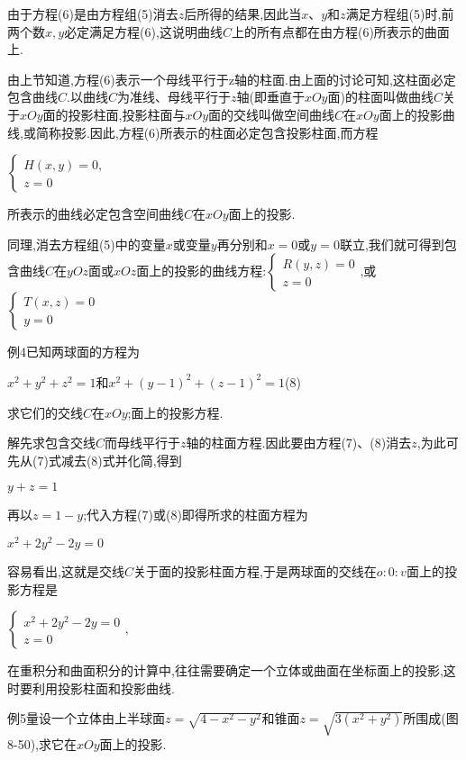 \documentclass[oneside]{book}
\begin{document}
由于方程(6)是由方程组(5)消去$z$后所得的结果,因此当$x$、$y$和$z$满足方程组(5)时,前两个数$x,y$必定满足方程(6),这说明曲线$C$上的所有点都在由方程(6)所表示的曲面上.

由上节知道,方程(6)表示一个母线平行于z轴的柱面.由上面的讨论可知,这柱面必定包含曲线$C$.以曲线$C$为准线、母线平行于$z$轴(即垂直于$xOy$面)的柱面叫做曲线$C$关于$xOy$面的投影柱面,投影柱面与$xOy$面的交线叫做空间曲线$C$在$xOy$面上的投影曲线,或简称投影.因此,方程(6)所表示的柱面必定包含投影柱面,而方程

$\left\{\begin{array}{l}{H(x, y)=0}, \\ {z=0}\end{array}\right.$

所表示的曲线必定包含空间曲线$C$在$xOy$面上的投影.

同理,消去方程组(5)中的变量$x$或变量$y$再分别和$x=0$或$y=0$联立,我们就可得到包含曲线$C$在$yOz$面或$xOz$面上的投影的曲线方程:$\left\{\begin{array}{l}{R(y, z)=0} \\ {z=0}\end{array}\right.$,或$\left\{\begin{array}{l}{T(x, z)=0} \\ {y=0}\end{array}\right.$

例4已知两球面的方程为

${x^2} + {y^2} + {z^2} = 1$和${x^2} + {\left( {y - 1} \right)^2} + {(z - 1)^2} = 1$(8)

求它们的交线$C$在$xOy$;面上的投影方程.

解先求包含交线$C$而母线平行于$z$轴的柱面方程.因此要由方程(7)、(8)消去$z$,为此可先从(7)式减去(8)式并化简,得到

$y + z = 1$

再以$z = 1 - y$;代入方程(7)或(8)即得所求的柱面方程为

${x^2} + 2{y^2} - 2y = 0$

容易看出,这就是交线$C$关于面的投影柱面方程,于是两球面的交线在$o:0:v$面上的投影方程是

$\left\{\begin{array}{l}{x^{2}+2 y^{2}-2 y=0} \\ {z=0}\end{array}\right.$,

在重积分和曲面积分的计算中,往往需要确定一个立体或曲面在坐标面上的投影,这时要利用投影柱面和投影曲线.

例5量设一个立体由上半球面$z = \sqrt {4 - {x^2} - {y^2}} $和锥面$z = \sqrt {3({x^2} + {y^2})} $所围成(图8-50),求它在$xOy$面上的投影.
\end{document}
